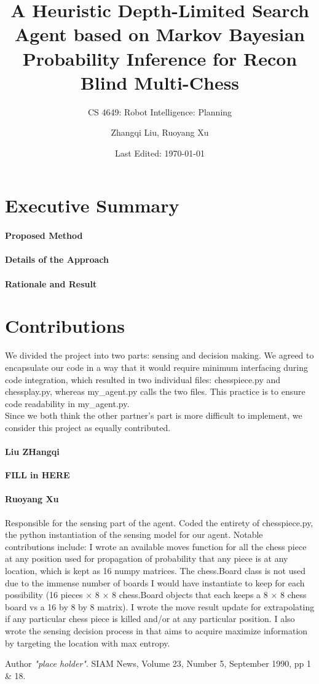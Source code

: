 \documentclass[11pt]{article}
\title{A Heuristic Depth-Limited Search Agent based on Markov Bayesian
Probability Inference for Recon Blind Multi-Chess}
\author{Zhangqi Liu, Ruoyang Xu}
\subtitle{CS 4649: Robot Intelligence: Planning}
\date{Last Edited: \today}
\begin{document}
\maketitle
\pagebreak

\section*{Executive Summary}
\paragraph{Proposed Method}

\paragraph{Details of the Approach}

\paragraph{Rationale and Result}

\section*{Contributions}
We divided the project into two parts: sensing and decision making. We agreed
to encapsulate our code in a way that it would require minimum interfacing
during code integration, which resulted in two individual files: chesspiece.py
and chessplay.py, whereas my\_agent.py calls the two files. This practice is to
ensure code readability in my\_agent.py.\vspace{6pt}\\
Since we both think the other partner's part is more difficult to implement,
we consider this project as equally contributed.

\paragraph{Liu ZHangqi} \textbf{FILL in HERE}
\paragraph{Ruoyang Xu} Responsible for the sensing part of the agent. Coded the
entirety of chesspiece.py, the python instantiation of the sensing model for
our agent. Notable contributions include: I wrote an available moves function
for all the chess piece at any position used for propagation of probability that
any piece is at any location, which is kept as 16 numpy matrices. The
chess.Board class is not used due to the immense number of boards I would have
instantiate to keep for each possibility (16 pieces $\times$ 8 $\times$ 8
chess.Board objects that each keeps a 8 $\times$ 8 chess board vs a 16 by 8 by
8 matrix). I wrote the move result update for extrapolating if any particular
chess piece is killed and/or at any particular position. I also wrote the
sensing decision process in that aims to acquire maximize information by
targeting the location with max entropy.


\begin{thebibliography}{9}
    Author
    \textit{"place holder"}. 
    SIAM News, Volume 23, Number 5, September 1990, pp 1 \& 18. 
\end{thebibliography}
\end{document}
